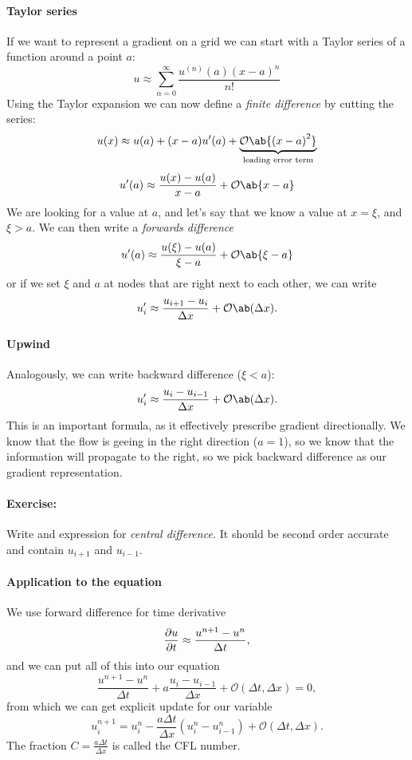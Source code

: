 \documentclass[justified, nobib,a4paper]{tufte-handout}
\begin{document}
\paragraph{Taylor series}
If we want to represent a gradient on a grid we can start with a Taylor series
of a function around a point $a$:
\[
	u \approx \sum\limits_{\alpha=0}^\infty \frac{u^{(n)}(a)(x-a)^n}{n!}
\]
Using the Taylor expansion we can now define a \emph{finite difference} by cutting the series:
\[
	u(x) \approx u(a) + (x-a)u'(a) + \underbrace{\mathcal{O}\ab\{{(x-a)}^2\}}_\text{leading error term}
\]
\[
	u'(a) \approx 	\frac{u(x) - u(a)}{x-a} + \mathcal{O}\ab\{x-a\}
\]
We are looking for a value at $a$, and let's say that we know a value at $x=\xi$, and
$\xi>a$. We can then write a \emph{forwards difference}
\[
	u'(a) \approx 	\frac{u(\xi) - u(a)}{\xi-a} + \mathcal{O}\ab\{\xi-a\}
\]
or if we set $\xi$ and $a$ at nodes that are right next to each other, we can write
\[
	u'_i \approx 	\frac{u_{i+1} - u_i}{\Delta x} + \mathcal{O}\ab(\Delta x).
\]
\paragraph{Upwind}
Analogously, we can write backward difference ($\xi < a$):
\[
	u'_i \approx 	\frac{u_{i} - u_{i-1}}{\Delta x} + \mathcal{O}\ab(\Delta x).
\]
This is an important formula, as it effectively prescribe gradient directionally. We know
that the flow is geeing in the right direction ($a=1$), so we know that the information will
propagate to the right, so we pick backward difference as our gradient representation.

\paragraph{Exercise:} Write and expression for \emph{central difference.} It should be second order accurate and contain $u_{i+1}$ and $u_{i-1}$.

\paragraph{Application to the equation}
We use forward difference for time derivative
\[
	\pdv{u}{t} \approx \frac{u^{n+1} - u^n}{\Delta t},
\]
and we can put all of this into our equation
\[
	\frac{u^{n+1} - u^n}{\Delta t}
	+ a \frac{u_{i} - u_{i-1}}{\Delta x} + \mathcal{O}(\Delta t, \Delta x) = 0,
\]
from which we can get explicit update for our variable
\begin{equation}
	u^{n+1}_i = u_i^n - \frac{a \Delta t}{\Delta x}(u_i^n - u_{i-1}^n)  + \mathcal{O}(\Delta t, \Delta x) .
	\label{eq:nume}
\end{equation}
The fraction $C = \frac{a \Delta t}{\Delta x}$ is called the CFL number.
\end{document}
